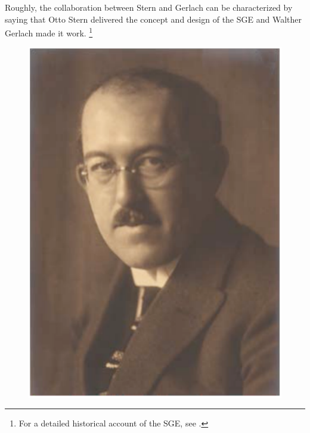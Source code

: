 \documentclass[12pt]{article}
\begin{document}
Roughly, the collaboration between Stern and Gerlach can be characterized by saying that Otto Stern delivered the concept and design of the SGE and Walther Gerlach made it work.%
\footnote{For a detailed historical account of the SGE, see \citep{TrageserW2011Effekt}.}
%
\begin{figure}
\begin{center}
\includegraphics[scale=0.5]{figures/Stern1920}

\end{center}
\end{figure}
\end{document}
